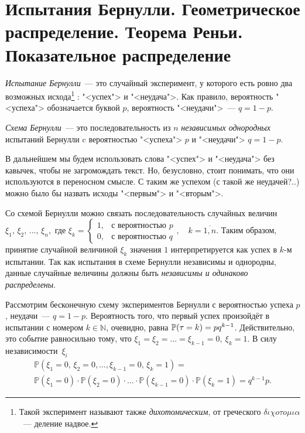 \section{Испытания Бернулли. Геометрическое распределение. Теорема Реньи. Показательное распределение}
\begin{defn}
    \textit{Испытание Бернулли}~--- это случайный эксперимент, у которого есть ровно два возможных 
    исхода\footnote{Такой эксперимент называют также \textit{дихотомическим}, от греческого $\delta \iota \chi o \tau o \mu \iota \alpha$~--- деление надвое.}
    : "<успех"> и "<неудача">. 
    Как правило, вероятность "<успеха"> обозначается буквой $p$, вероятность "<неудачи">~--- $q = 1 - p$.
\end{defn}

\begin{defn}
    \textit{Схема Бернулли}~--- это последовательность из $n$ \textit{независимых однородных} испытаний Бернулли c вероятностью "<успеха"> $p$ и "<неудачи"> $q = 1 - p$.
\end{defn}

\begin{rmrk}
    В дальнейшем мы будем использовать слова "<успех"> и "<неудача"> без кавычек, чтобы не загромождать текст. 
    Но, безусловно, стоит понимать, что они используются в переносном смысле. С таким же успехом (с такой же неудачей?..) можно было бы назвать исходы "<первым"> и "<вторым">.
\end{rmrk}

Со схемой Бернулли можно связать последовательность случайных величин $\xi_1,\, \xi_2,\, \ldots,\, \xi_n,$ где $\xi_k = \begin{cases} 1, &\text{с вероятностью } p \\ 0, &\text{с вероятностью } q\end{cases}, \quad k = \overline{1, n}$.
Таким образом, принятие случайной величиной $\xi_k$ значения $1$ интерпретируется как успех в $k$-м испытании.
Так как испытания в схеме Бернулли независимы и однородны, данные случайные величины должны быть \textit{независимы и одинаково распределены}.

Рассмотрим бесконечную схему экспериментов Бернулли с вероятностью успеха $p$, неудачи~--- $q = 1 - p$. 
Вероятность того, что первый успех произойдёт в испытании с номером $k \in \mathbb{N}$, очевидно, равна ${\mathbb{P}(\tau = k)} = pq^{k-1}$.
Действительно, это событие равносильно тому, что $\xi_1 = \xi_2 = \ldots = \xi_{k-1} = 0,\: \xi_k = 1$. 
В силу независимости~$\xi_i$
\begin{multline*}
    \mathbb{P}(\xi_1 = 0,\, \xi_2 = 0, \ldots, \xi_{k-1} = 0,\, \xi_k = 1) = \\
    \mathbb{P}(\xi_1 = 0) \cdot \mathbb{P}(\xi_2 = 0) \cdot \ldots \cdot \mathbb{P}(\xi_{k-1} = 0) \cdot \mathbb{P}(\xi_k = 1) =
    q^{k-1}p.
\end{multline*}

